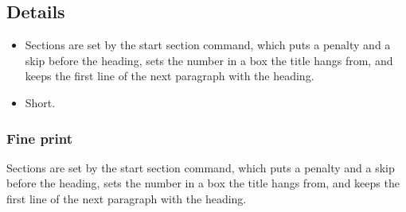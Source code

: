 \documentclass[12pt]{report}
\begin{document}
\subsection{Details}
\begin{itemize}
\item Sections are set by the start section command, which puts a penalty and a skip before the heading, sets the number in a box the title hangs from, and keeps the first line of the next paragraph with the heading.
\item Short.
\end{itemize}
\subsubsection{Fine print}
Sections are set by the start section command, which puts a penalty and a skip before the heading, sets the number in a box the title hangs from, and keeps the first line of the next paragraph with the heading.
\end{document}
